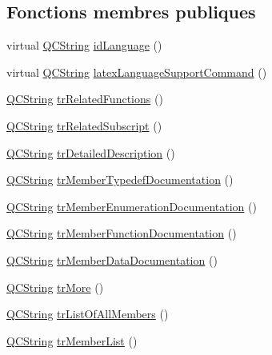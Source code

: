 \subsection*{Fonctions membres publiques}
\begin{DoxyCompactItemize}
\item 
virtual \hyperlink{class_q_c_string}{Q\+C\+String} \hyperlink{class_translator_italian_a03fa97515ddfa1510cafc3a6070bd798}{id\+Language} ()
\item 
virtual \hyperlink{class_q_c_string}{Q\+C\+String} \hyperlink{class_translator_italian_a627c83ff76fb011b240d99de017dd2c7}{latex\+Language\+Support\+Command} ()
\item 
\hyperlink{class_q_c_string}{Q\+C\+String} \hyperlink{class_translator_italian_ad87f9c040ad9cd778a70fbf929002f6c}{tr\+Related\+Functions} ()
\item 
\hyperlink{class_q_c_string}{Q\+C\+String} \hyperlink{class_translator_italian_a5c4d31a12192bcf85b45ea492e3777d8}{tr\+Related\+Subscript} ()
\item 
\hyperlink{class_q_c_string}{Q\+C\+String} \hyperlink{class_translator_italian_a1b1fe2622428c4613dab5aa77624ff95}{tr\+Detailed\+Description} ()
\item 
\hyperlink{class_q_c_string}{Q\+C\+String} \hyperlink{class_translator_italian_ac65ce719d3575b96d0eb2165689dd4fd}{tr\+Member\+Typedef\+Documentation} ()
\item 
\hyperlink{class_q_c_string}{Q\+C\+String} \hyperlink{class_translator_italian_a3063e66759faae2f04fe8fe8a8790942}{tr\+Member\+Enumeration\+Documentation} ()
\item 
\hyperlink{class_q_c_string}{Q\+C\+String} \hyperlink{class_translator_italian_ac61a2916232c9c2350aee95d20f0f368}{tr\+Member\+Function\+Documentation} ()
\item 
\hyperlink{class_q_c_string}{Q\+C\+String} \hyperlink{class_translator_italian_a4afcca626ade00f54d0d799937be8354}{tr\+Member\+Data\+Documentation} ()
\item 
\hyperlink{class_q_c_string}{Q\+C\+String} \hyperlink{class_translator_italian_a4aea4630e1a34c3df9e8d586662ae018}{tr\+More} ()
\item 
\hyperlink{class_q_c_string}{Q\+C\+String} \hyperlink{class_translator_italian_a94c13af529cf8a66183315fbaf35858d}{tr\+List\+Of\+All\+Members} ()
\item 
\hyperlink{class_q_c_string}{Q\+C\+String} \hyperlink{class_translator_italian_a8c341d470dbb7dc4264e21067249952b}{tr\+Member\+List} ()
\item 

\end{DoxyCompactItemize}
